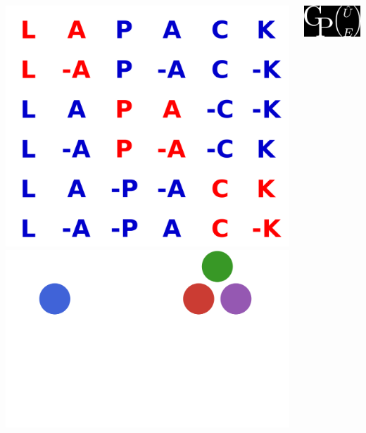 \documentclass{beamer}
\begin{document}
\begin{frame}
\begin{columns}
\begin{columns}
\includegraphics[width=\textwidth]{lapack.png}
\includegraphics[width=\textwidth]{julia.png}
\end{columns}
\begin{columns}
\includegraphics[width=\textwidth]{gpue.png}

\end{columns}
\end{columns}
\end{frame}
\end{document}
